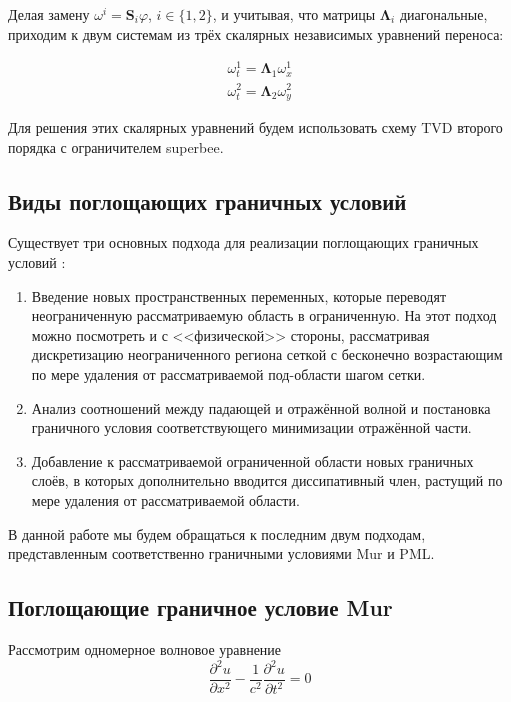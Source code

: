 Делая замену $\omega^i =  \pmb{S}_i \varphi$, $i\in\{1,2\}$, и учитывая, что матрицы $\pmb{\Lambda}_i$ диагональные, приходим к двум системам из трёх скалярных независимых уравнений переноса:

\begin{equation}
\begin{gathered} 
	\omega^1_t = \pmb{\Lambda}_1 \omega^1_x\\
	\omega^2_t = \pmb{\Lambda}_2 \omega^2_y
\end{gathered}
\end{equation}

Для решения этих скалярных уравнений будем использовать схему TVD второго порядка с ограничителем superbee.

\subsection{Виды поглощающих граничных условий}

Существует три основных подхода для реализации поглощающих граничных условий \cite{Trefethen1996FiniteDA} \cite{arch_comp_sim}:
\begin{enumerate}
    \item  Введение новых пространственных переменных, которые переводят неограниченную рассматриваемую область в ограниченную. На этот подход можно посмотреть и с <<физической>> стороны, рассматривая дискретизацию неограниченного региона сеткой с бесконечно возрастающим по мере удаления от рассматриваемой под-области шагом сетки.
    \item Анализ соотношений между падающей и отражённой волной и постановка граничного условия соответствующего минимизации отражённой части.
    \item Добавление к рассматриваемой ограниченной области новых граничных слоёв, в которых дополнительно вводится диссипативный член, растущий по мере удаления от рассматриваемой области.
\end{enumerate}

В данной работе мы будем обращаться к последним двум подходам, представленным соответственно граничными условиями Mur и PML.

\subsection{Поглощающие граничное условие Mur}

Рассмотрим одномерное волновое уравнение
\begin{equation}
    \dfrac{\partial^2 u}{\partial x^2} - \dfrac{1}{c^2}\dfrac{\partial^2 u}{\partial t^2} = 0
    \label{eq:1d_wave_eq}
\end{equation}

